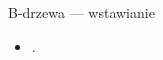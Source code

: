 \documentclass{beamer}
\begin{document}
\begin{frame}{B-drzewa --- wstawianie}
\begin{itemize}
\item .
\end{itemize}
\end{frame}

%







\end{document}
